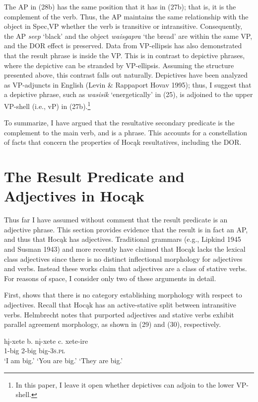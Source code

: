 \documentclass[output=paper]{LSP/langsci}
\begin{document}
The AP in (28b) has the same position that it has in (27b); that is, it is the complement of the verb. Thus, the AP maintains the same relationship with the object in Spec,VP whether the verb is transitive or intransitive. Consequently, the AP \textit{seep} `black' and the object \textit{waisgapra} `the bread' are within the same VP, and the DOR effect is preserved. Data from VP-ellipsis has also demonstrated that the result phrase is inside the VP. This is in contrast to depictive phrases, where the depictive can be stranded by VP-ellipsis. Assuming the structure presented above, this contrast falls out naturally. Depictives have been analyzed as VP-adjuncts in English (Levin \& Rappaport Hovav 1995); thus, I suggest that a depictive phrase, such as \textit{wasisik} `energetically' in (25), is adjoined to the upper VP-shell (i.e., vP) in (27b).\footnote{In this paper, I leave it open whether depictives can adjoin to the lower VP-shell.}

To summarize, I have argued that the resultative secondary predicate is the complement to the main verb, and is a phrase. This accounts for a constellation of facts that concern the properties of Hocąk resultatives, including the DOR.

\section{The Result Predicate and Adjectives in Hocąk} 

Thus far I have assumed without comment that the result predicate is an adjective phrase. This section provides evidence that the result is in fact an AP, and thus that Hocąk has adjectives. Traditional grammars (e.g., Lipkind 1945 and Susman 1943) and more recently \citet{Helmbrecht2006} have claimed that Hocąk lacks the lexical class adjectives since there is no distinct inflectional morphology for adjectives and verbs. Instead these works claim that adjectives are a class of stative verbs. For reasons of space, I consider only two of these arguments in detail.

First, \citet{Helmbrecht2006} shows that there is no category establishing morphology with respect to adjectives. Recall that Hocąk has an active-stative split between intransitive verbs. Helmbrecht notes that purported adjectives and stative verbs exhibit parallel agreement morphology, as shown in (29) and (30), respectively.

\begin{exe}
\ex
\begin{xlist}
\ex \gll
hį-xete \hspace{36pt} b. {}  nį-xete \hspace{48pt} c. {} xete-ire\\
1-big {} {} {} 2-big {} {}  {} big-\textsc{3s.pl}\\
\glt `I am big.' \hspace{1.2cm} `You are big.' \hspace{1.1cm} `They are big.'

\end{xlist}
\end{exe}
\end{document}
